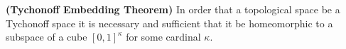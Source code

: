 \textbf{(Tychonoff Embedding Theorem)} In order that a topological space be a Tychonoff space it is necessary and sufficient that it be homeomorphic to a subspace of a cube $[0,1]^\kappa$ for some cardinal $\kappa$.
